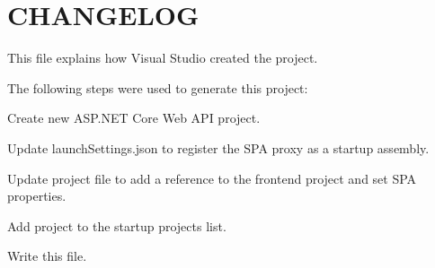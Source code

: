 \chapter{CHANGELOG}
\hypertarget{md__d_1_2_g_i_t_2_food_link_2_food_link_8_server_2_c_h_a_n_g_e_l_o_g}{}\label{md__d_1_2_g_i_t_2_food_link_2_food_link_8_server_2_c_h_a_n_g_e_l_o_g}
This file explains how Visual Studio created the project.

The following steps were used to generate this project\+:
\begin{DoxyItemize}
\item Create new ASP.NET Core Web API project.
\item Update {\ttfamily launch\+Settings.\+json} to register the SPA proxy as a startup assembly.
\item Update project file to add a reference to the frontend project and set SPA properties.
\item Add project to the startup projects list.
\item Write this file. 
\end{DoxyItemize}